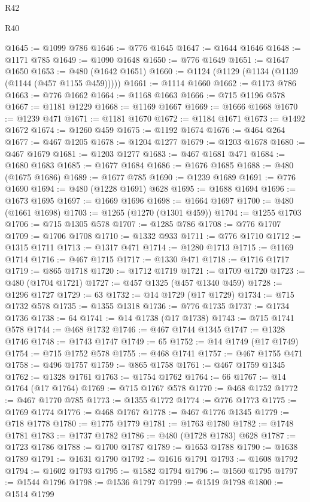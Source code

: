 \begin{lexlean}{R42}
\begin{lexlean}{R40}
\begin{coremodule}
{{{{{{{{{{{{{{{{{{{{{{{{{{{{{{{{{{{{{{{{{{{{{{{{{{{{{{{{{{{{{{{{{{{{{{{{{{{{{{{{{{{{{{{{{{{{{{{{{{{{{{{{{{{{{@1645 := @1099 @786
@1646 := @776 @1645
@1647 := @1644 @1646
@1648 := @1171 @785
@1649 := @1090 @1648
@1650 := @776 @1649
@1651 := @1647 @1650
@1653 := @480 (@1642 @1651)
@1660 := @1124 (@1129 (@1134 (@1139 (@1144 (@457 @1155 @459)))))
@1661 := @1114 @1660
@1662 := @1173 @786
@1663 := @776 @1662
@1664 := @1168 @1663
@1666 := @715 @1196 @578
@1667 := @1181 @1229
@1668 := @1169 @1667
@1669 := @1666 @1668
@1670 := @1239 @471
@1671 := @1181 @1670
@1672 := @1184 @1671
@1673 := @1492 @1672
@1674 := @1260 @459
@1675 := @1192 @1674
@1676 := @464 @264
@1677 := @467 @1205
@1678 := @1204 @1277
@1679 := @1203 @1678
@1680 := @467 @1679
@1681 := @1203 @1277
@1683 := @467 @1681 @471
@1684 := @1680 @1683
@1685 := @1677 @1684
@1686 := @1676 @1685
@1688 := @480 (@1675 @1686)
@1689 := @1677 @785
@1690 := @1239 @1689
@1691 := @776 @1690
@1694 := @480 (@1228 @1691) @628
@1695 := @1688 @1694
@1696 := @1673 @1695
@1697 := @1669 @1696
@1698 := @1664 @1697
@1700 := @480 (@1661 @1698)
@1703 := @1265 (@1270 (@1301 @459))
@1704 := @1255 @1703
@1706 := @715 @1305 @578
@1707 := @1285 @786
@1708 := @776 @1707
@1709 := @1706 @1708
@1710 := @1332 @933
@1711 := @776 @1710
@1712 := @1315 @1711
@1713 := @1317 @471
@1714 := @1280 @1713
@1715 := @1169 @1714
@1716 := @467 @1715
@1717 := @1330 @471
@1718 := @1716 @1717
@1719 := @865 @1718
@1720 := @1712 @1719
@1721 := @1709 @1720
@1723 := @480 (@1704 @1721)
@1727 := @457 @1325 (@457 @1340 @459)
@1728 := @1296 @1727
@1729 := 63
@1732 := @14 @1729 (@17 @1729)
@1734 := @715 @1732 @578
@1735 := @1355 @1318
@1736 := @776 @1735
@1737 := @1734 @1736
@1738 := 64
@1741 := @14 @1738 (@17 @1738)
@1743 := @715 @1741 @578
@1744 := @468 @1732
@1746 := @467 @1744 @1345
@1747 := @1328 @1746
@1748 := @1743 @1747
@1749 := 65
@1752 := @14 @1749 (@17 @1749)
@1754 := @715 @1752 @578
@1755 := @468 @1741
@1757 := @467 @1755 @471
@1758 := @496 @1757
@1759 := @865 @1758
@1761 := @467 @1759 @1345
@1762 := @1328 @1761
@1763 := @1754 @1762
@1764 := 66
@1767 := @14 @1764 (@17 @1764)
@1769 := @715 @1767 @578
@1770 := @468 @1752
@1772 := @467 @1770 @785
@1773 := @1355 @1772
@1774 := @776 @1773
@1775 := @1769 @1774
@1776 := @468 @1767
@1778 := @467 @1776 @1345
@1779 := @718 @1778
@1780 := @1775 @1779
@1781 := @1763 @1780
@1782 := @1748 @1781
@1783 := @1737 @1782
@1786 := @480 (@1728 @1783) @628
@1787 := @1723 @1786
@1788 := @1700 @1787
@1789 := @1653 @1788
@1790 := @1638 @1789
@1791 := @1631 @1790
@1792 := @1616 @1791
@1793 := @1608 @1792
@1794 := @1602 @1793
@1795 := @1582 @1794
@1796 := @1560 @1795
@1797 := @1544 @1796
@1798 := @1536 @1797
@1799 := @1519 @1798
@1800 := @1514 @1799
}}}}}}}}}}}}}}}}}}}}}}}}}}}}}}}}}}}}}}}}}}}}}}}}}}}}}}}}}}}}}}}}}}}}}}}}}}}}}}}}}}}}}}}}}}}}}}}}}}}}}}}}}}}}}
\end{coremodule}
\end{lexlean}
\end{lexlean}
